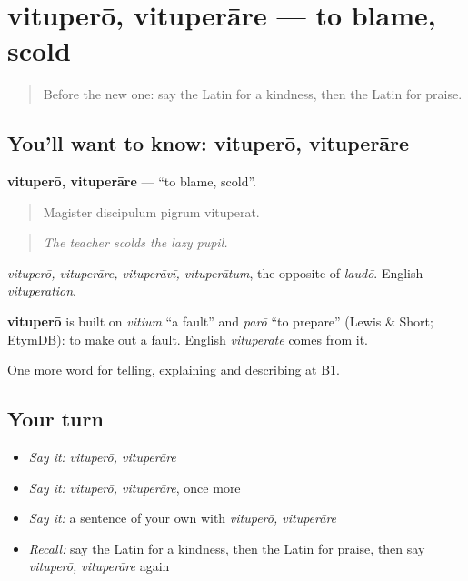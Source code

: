 \section[vituperō, vituperāre]{vituperō, vituperāre — to blame, scold}

\label{lesson:LA-C512-vitupero}



\begin{quote}
Before the new one: say the Latin for a kindness, then the Latin for praise.
\end{quote}

\subsection*{You'll want to know: vituperō, vituperāre}
\textbf{vituperō, vituperāre} — \textquotedblleft{}to blame, scold\textquotedblright{}.

\begin{quote}
Magister discipulum pigrum vituperat.
\end{quote}

\begin{quote}
\emph{The teacher scolds the lazy pupil.}
\end{quote}

\emph{vituperō, vituperāre, vituperāvī, vituperātum}, the opposite of \emph{laudō}. English \emph{vituperation}.

\begin{cousinweb}
\textbf{vituperō} is built on \emph{vitium} \textquotedblleft{}a fault\textquotedblright{} and \emph{parō} \textquotedblleft{}to prepare\textquotedblright{} (Lewis \& Short; EtymDB): to make out a fault. English \emph{vituperate} comes from it.
\end{cousinweb}

\begin{grammarlens}[title={What you've built}]
One more word for telling, explaining and describing at B1.
\end{grammarlens}

\subsection*{Your turn}
\begin{itemize}
\raggedright
  \item \emph{Say it:} \emph{vituperō, vituperāre}
  \item \emph{Say it:} \emph{vituperō, vituperāre}, once more
  \item \emph{Say it:} a sentence of your own with \emph{vituperō, vituperāre}
  \item \emph{Recall:} say the Latin for a kindness, then the Latin for praise, then say \emph{vituperō, vituperāre} again
\end{itemize}

